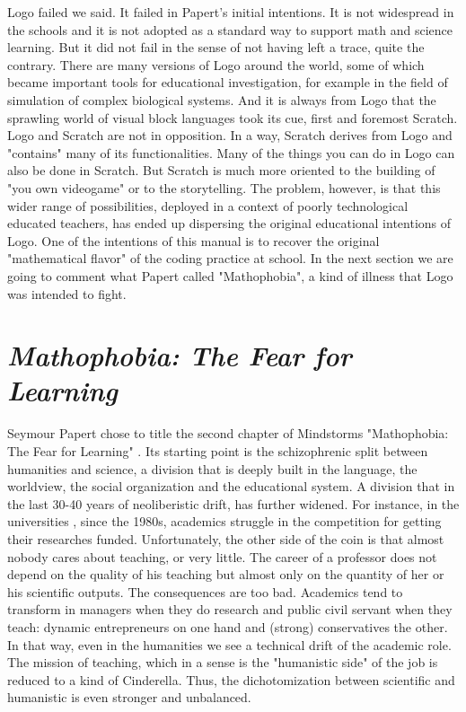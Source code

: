 Logo failed we said. It failed in Papert's initial intentions. It is not widespread in the schools and it is not adopted as a standard way to support math and science learning. But it did not fail in the sense of not having left a trace, quite the contrary. There are many versions of Logo around the world, some of which became important tools for educational investigation, for example in the field of simulation of complex biological systems. And it is always from Logo that the sprawling world of visual block languages took its cue, first and foremost Scratch. Logo and Scratch are not in opposition. In a way, Scratch derives from Logo and "contains" many of its functionalities. Many of the things you can do in Logo can also be done in Scratch. But Scratch is much more oriented to the building of "you own videogame" or to the storytelling. The problem, however, is that this wider range of possibilities, deployed in a context of poorly technological educated teachers, has ended up dispersing the original educational intentions of Logo. One of the intentions of this manual is to recover the original "mathematical flavor" of the coding practice at school. In the next section we are going to comment what Papert called "Mathophobia", a kind of illness that Logo was intended to fight.

\section{\textit{\textit{Mathophobia}: The Fear for Learning}}

Seymour Papert chose to title the second chapter of Mindstorms "Mathophobia: The Fear for Learning" . Its starting point is the schizophrenic split between humanities and science, a division that is deeply built in the language, the worldview, the social organization and the educational system. A division that in the last 30-40 years of neoliberistic drift, has further widened. For instance, in the universities , since the 1980s, academics struggle in the competition for getting their researches funded. Unfortunately, the other side of the coin is that almost nobody cares about teaching, or very little. The career of a professor does not depend on the quality of his teaching but almost only on the quantity of her or his scientific outputs. The consequences are too bad. Academics tend to transform in managers when they do research and public civil servant when they teach: dynamic entrepreneurs on one hand and (strong) conservatives the other. In that way, even in the humanities we see a technical drift of the academic role. The mission of teaching, which in a sense is the "humanistic side"  of the job  is reduced to a kind of Cinderella. Thus, the dichotomization between scientific and humanistic is even stronger and unbalanced.


